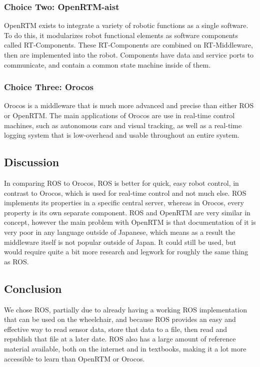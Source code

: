 \documentclass[onecolumn, draftclsnofoot,10pt, compsoc]{report}
\begin{document}
\subsubsection{Choice Two: OpenRTM-aist}
OpenRTM exists to integrate a variety of robotic functions as a single software. To do this, it modularizes robot functional elements as software components called RT-Components. These RT-Components are combined on RT-Middleware, then are implemented into the robot. Components have data and service ports to communicate, and contain a common state machine inside of them.\cite{OpenRTM_Info}

\subsubsection{Choice Three: Orocos}
Orocos is a middleware that is much more advanced and precise than either ROS or OpenRTM. The main applications of Orocos are use in real-time control machines, such as autonomous cars and visual tracking, as well as a real-time logging system that is low-overhead and usable throughout an entire system.\cite{Orocos_Roadmap}

\subsection{Discussion}
In comparing ROS to Orocos, ROS is better for quick, easy robot control, in contrast to Orocos, which is used for real-time control and not much else. ROS implements its properties in a specific central server, whereas in Orocos, every property is its own separate component.\cite{Orocos_And_ROS} ROS and OpenRTM are very similar in concept, however the main problem with OpenRTM is that documentation of it is very poor in any language outside of Japanese, which means as a result the middleware itself is not popular outside of Japan. It could still be used, but would require quite a bit more research and legwork for roughly the same thing as ROS.\cite{Robot_Middleware}

\subsection{Conclusion}
We chose ROS, partially due to already having a working ROS implementation that can be used on the wheelchair, and because ROS provides an easy and effective way to read sensor data, store that data to a file, then read and republish that file at a later date. ROS also has a large amount of reference material available, both on the internet and in textbooks, making it a lot more accessible to learn than OpenRTM or Orocos.
\end{document}

